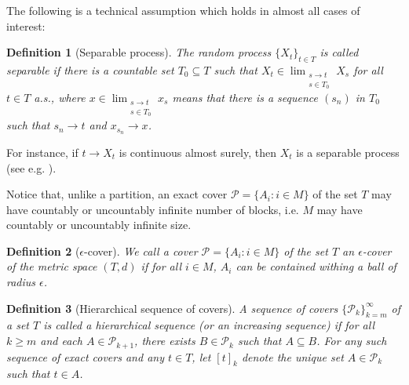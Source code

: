 \documentclass{article}
\newtheorem{definition}{Definition}
\newcommand{\pa}{\mathcal{P}}
\begin{document}
The following is a technical assumption which holds in almost all cases of interest:
\begin{definition} [Separable process] \label{Separable process}
The random process $\{X_t\}_{t\in T}$ is called \emph{separable} if there is a countable set $T_0\subseteq T$ such that $X_t\in \lim_{\substack{s\rightarrow t \\ s\in T_0}} X_s$ for all $t\in T$  a.s.,
where $x\in \lim_{\substack{s\rightarrow t \\ s\in T_0}} x_s$ means that there is a sequence $(s_n)$ in $T_0$ such that $s_n\rightarrow t$ and $x_{s_n}\rightarrow x$.
\end{definition}
For instance, if $t\to X_t$ is continuous almost surely, then $X_t$ is a separable process (see e.g. \cite{Ramon}). 

Notice that, unlike a partition, an exact cover $\pa=\{A_i: i\in M\}$ of the set $T$ may have countably or uncountably infinite number of blocks, i.e. $M$ may have countably or uncountably infinite size.
\begin{definition}[$\epsilon$-cover]\label{epsilon cover definition} We call a cover $\pa=\{A_i: i\in M\}$ of the set $T$ an \emph{$\epsilon$-cover} of the metric space $(T,d)$ if for all $i\in M$, $A_i$ can be contained withing a ball of radius $\epsilon$. 
\end{definition} 
\begin{definition}[Hierarchical sequence of covers]
	A sequence of covers $\{\pa_k\}_{k=m}^{\infty}$ of a set $T$ is called a \emph{hierarchical sequence} (or an \emph{increasing sequence}) if for all $k\geq m$ and each $A\in\pa_{k+1}$, there exists $B\in \pa_k$ such that $A\subseteq B$. For any such sequence of exact covers and any $t\in T$, let $[t]_k$ denote the unique set $A\in \pa_k$ such that $t\in A$.
\end{definition}
\end{document}
